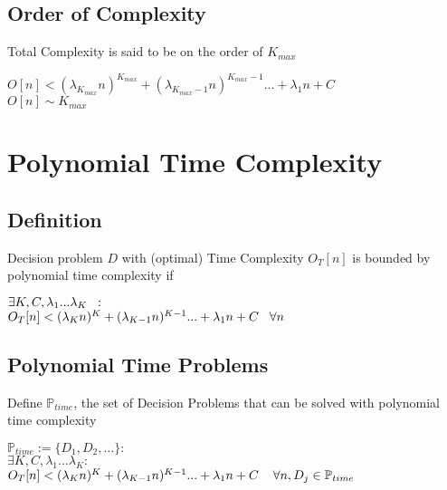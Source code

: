 \documentclass[11pt]{article}
\begin{document}
\subsection{Order of Complexity}
Total Complexity is said to be on the order of $K_{max}$
\begin{center}
$
O[n] < (\lambda_{K_{max}} n)^{K_{max}} + (\lambda_{K_{max}-1} n)^{K_{max}-1}... + \lambda_1 n + C
$
\\ \vspace{2mm}
$
O[n] \sim K_{max}
$
\end{center}




\newpage
\section{Polynomial Time Complexity}

\subsection{Definition}
Decision problem $D$ with (optimal) Time Complexity $O_T[n]$ is bounded by polynomial time complexity if
\begin{center}
$\exists K,C,\lambda_1...\lambda_K \hspace{2mm} :$
\\ \vspace{2mm}
$O_T[n] < (\lambda_K n)^K + (\lambda_{K-1} n)^{K-1}... + \lambda_1 n + C \hspace{3mm} \forall n$
\end{center}








\subsection{Polynomial Time Problems}
Define $\mathbb{P}_{time}$, the set of Decision Problems that can be solved with polynomial time complexity
\begin{center}
$
\mathbb{P}_{time} := \{D_1,D_2,...\} : 
$
\\
$
\exists K,C,\lambda_1...\lambda_K : 
$
\\
$
O_T[n] < (\lambda_K n)^K + (\lambda_{K-1} n)^{K-1}... + \lambda_1 n + C \hspace{4mm} \forall n, D_j \in \mathbb{P}_{time}
$
\end{center}
\end{document}
